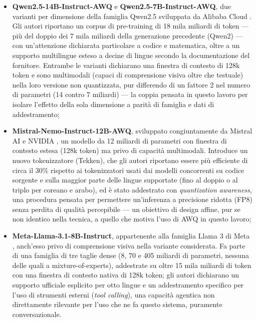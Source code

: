\begin{itemize}
  \item \textbf{Qwen2.5-14B-Instruct-AWQ} e \textbf{Qwen2.5-7B-Instruct-AWQ}, due varianti per dimensione della
    famiglia Qwen2.5 sviluppata da Alibaba Cloud \cite{qwen2024technical}. Gli autori riportano un corpus di
    pre-training di 18 mila miliardi di token --- più del doppio dei 7 mila miliardi della generazione precedente
    (Qwen2) --- con un'attenzione dichiarata particolare a codice e matematica, oltre a un supporto multilingue esteso
    a decine di lingue secondo la documentazione del fornitore. Entrambe le varianti dichiarano una finestra di
    contesto di 128k token e sono multimodali (capaci di comprensione visiva oltre che testuale) nella loro versione
    non quantizzata, pur differendo di un fattore 2 nel numero di parametri (14 contro 7 miliardi) --- la coppia
    pensata in questo lavoro per isolare l'effetto della sola dimensione a parità di famiglia e dati di addestramento;
  \item \textbf{Mistral-Nemo-Instruct-12B-AWQ}, sviluppato congiuntamente da Mistral AI e NVIDIA
    \cite{mistralai2024nemo}, un modello da 12 miliardi di parametri con finestra di contesto estesa (128k token) ma
    privo di capacità multimodali. Introduce un nuovo tokenizzatore (Tekken), che gli autori riportano essere più
    efficiente di circa il 30\% rispetto ai tokenizzatori usati dai modelli concorrenti su codice sorgente e sulla
    maggior parte delle lingue supportate (fino al doppio o al triplo per coreano e arabo), ed è stato addestrato con
    \emph{quantization awareness}, una procedura pensata per permettere un'inferenza a precisione ridotta (FP8) senza
    perdita di qualità percepibile --- un obiettivo di design affine, pur se non identico nella tecnica, a quello che
    motiva l'uso di AWQ in questo lavoro;
  \item \textbf{Meta-Llama-3.1-8B-Instruct}, appartenente alla famiglia Llama 3 di Meta \cite{grattafiori2024llama3},
    anch'esso privo di comprensione visiva nella variante considerata. Fa parte di una famiglia di tre taglie dense
    (8, 70 e 405 miliardi di parametri, nessuna delle quali a mixture-of-experts), addestrate su oltre 15 mila
    miliardi di token con una finestra di contesto nativa di 128k token; gli autori dichiarano un supporto ufficiale
    esplicito per otto lingue e un addestramento specifico per l'uso di strumenti esterni (\emph{tool calling}), una
    capacità agentica non direttamente rilevante per l'uso che ne fa questo sistema, puramente conversazionale.
\end{itemize}

